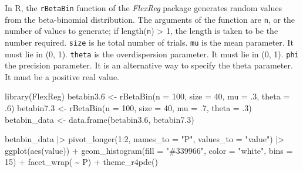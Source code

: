 \documentclass[
  letterpaper,
]{book}
\newenvironment{Shaded}{\begin{snugshade}}{\end{snugshade}}
\newcommand{\AttributeTok}[1]{\textcolor[rgb]{0.40,0.45,0.13}{#1}}
\newcommand{\DecValTok}[1]{\textcolor[rgb]{0.68,0.00,0.00}{#1}}
\newcommand{\FloatTok}[1]{\textcolor[rgb]{0.68,0.00,0.00}{#1}}
\newcommand{\FunctionTok}[1]{\textcolor[rgb]{0.28,0.35,0.67}{#1}}
\newcommand{\NormalTok}[1]{\textcolor[rgb]{0.00,0.23,0.31}{#1}}
\newcommand{\OtherTok}[1]{\textcolor[rgb]{0.00,0.23,0.31}{#1}}
\newcommand{\SpecialCharTok}[1]{\textcolor[rgb]{0.37,0.37,0.37}{#1}}
\newcommand{\StringTok}[1]{\textcolor[rgb]{0.13,0.47,0.30}{#1}}
\begin{document}
In R, the \texttt{rBetaBin} function of the \emph{FlexReg} package
generates random values from the beta-binomial distribution. The
arguments of the function are \texttt{n}, or the number of values to
generate; if length(\texttt{n}) \textgreater{} 1, the length is taken to
be the number required. \texttt{size} is he total number of trials.
\texttt{mu} is the mean parameter. It must lie in (0, 1). \texttt{theta}
is the overdispersion parameter. It must lie in (0, 1). \texttt{phi} the
precision parameter. It is an alternative way to specify the theta
parameter. It must be a positive real value.

\begin{Shaded}
\begin{Highlighting}[]
\FunctionTok{library}\NormalTok{(FlexReg) }
\NormalTok{betabin3}\FloatTok{.6} \OtherTok{\textless{}{-}} \FunctionTok{rBetaBin}\NormalTok{(}\AttributeTok{n =} \DecValTok{100}\NormalTok{, }\AttributeTok{size =} \DecValTok{40}\NormalTok{, }\AttributeTok{mu =}\NormalTok{ .}\DecValTok{3}\NormalTok{, }\AttributeTok{theta =}\NormalTok{ .}\DecValTok{6}\NormalTok{)}
\NormalTok{betabin7}\FloatTok{.3} \OtherTok{\textless{}{-}} \FunctionTok{rBetaBin}\NormalTok{(}\AttributeTok{n =} \DecValTok{100}\NormalTok{, }\AttributeTok{size =} \DecValTok{40}\NormalTok{, }\AttributeTok{mu =}\NormalTok{ .}\DecValTok{7}\NormalTok{, }\AttributeTok{theta =}\NormalTok{ .}\DecValTok{3}\NormalTok{)}
\NormalTok{betabin\_data }\OtherTok{\textless{}{-}} \FunctionTok{data.frame}\NormalTok{(betabin3}\FloatTok{.6}\NormalTok{, betabin7}\FloatTok{.3}\NormalTok{)}
\end{Highlighting}
\end{Shaded}

\begin{Shaded}
\begin{Highlighting}[]
\NormalTok{betabin\_data }\SpecialCharTok{|\textgreater{}}
  \FunctionTok{pivot\_longer}\NormalTok{(}\DecValTok{1}\SpecialCharTok{:}\DecValTok{2}\NormalTok{, }\AttributeTok{names\_to =} \StringTok{"P"}\NormalTok{,}
               \AttributeTok{values\_to =} \StringTok{"value"}\NormalTok{) }\SpecialCharTok{|\textgreater{}}
  \FunctionTok{ggplot}\NormalTok{(}\FunctionTok{aes}\NormalTok{(value)) }\SpecialCharTok{+}
  \FunctionTok{geom\_histogram}\NormalTok{(}\AttributeTok{fill =} \StringTok{"\#339966"}\NormalTok{,}
                 \AttributeTok{color =} \StringTok{"white"}\NormalTok{,}
                 \AttributeTok{bins =} \DecValTok{15}\NormalTok{) }\SpecialCharTok{+}
  \FunctionTok{facet\_wrap}\NormalTok{( }\SpecialCharTok{\textasciitilde{}}\NormalTok{ P) }\SpecialCharTok{+}
  \FunctionTok{theme\_r4pde}\NormalTok{()}
\end{Highlighting}
\end{Shaded}
\end{document}
